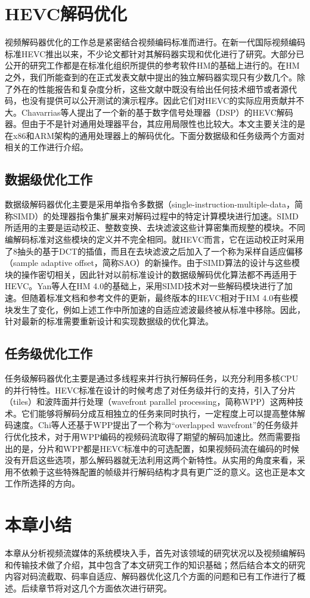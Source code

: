 \section{HEVC解码优化}

视频解码器优化的工作总是紧密结合视频编码标准而进行。在新一代国际视频编码标准HEVC推出以来，不少论文都针对其解码器实现和优化进行了研究。大部分已公开的研究工作都是在标准化组织所提供的参考软件HM\supercite{HM}的基础上进行的。在HM之外，我们所能查到的在正式发表文献中提出的独立解码器实现只有少数几个\supercite{Bossen-TCSVT2012,JCTVC-G988,JCTVC-H0693}。除了外在的性能报告和复杂度分析，这些文献中既没有给出任何技术细节或者源代码，也没有提供可以公开测试的演示程序。因此它们对HEVC的实际应用贡献并不大。Chavarrias等人\supercite{Chavarrias-TCE2013}提出了一个新的基于数字信号处理器（DSP）的HEVC解码器。但由于不是针对通用处理器平台，其应用局限性也比较大。本文主要关注的是在x86和ARM架构的通用处理器上的解码优化。下面分数据级和任务级两个方面对相关的工作进行介绍。

\subsection{数据级优化工作}

数据级解码器优化主要是采用单指令多数据（single-instruction-multiple-data，简称SIMD）的处理器指令集扩展来对解码过程中的特定计算模块进行加速。SIMD所适用的主要是运动校正、整数变换、去块滤波这些计算密集而规整的模块。不同编解码标准对这些模块的定义并不完全相同。就HEVC而言，它在运动校正时采用了8抽头的基于DCT的插值\supercite{JCTVC-F537}，而且在去块滤波之后加入了一个称为采样自适应偏移（sample adaptive offset，简称SAO）的新操作\supercite{Fu-TCSVT2012}。由于SIMD算法的设计与这些模块的操作密切相关，因此针对以前标准设计的数据级解码优化算法\supercite{Casalino-ICMCS1999,Lappalainen-TCSVT2003,Malvar-TCSVT2003,Chen-JVCIR2006,Pescador-TCE2009}都不再适用于HEVC。Yan等人\supercite{Yan-VCIP2012}在HM 4.0的基础上，采用SIMD技术对一些解码模块进行了加速。但随着标准文档和参考文件的更新，最终版本的HEVC相对于HM 4.0有些模块发生了变化，例如上述工作中所加速的自适应滤波\supercite{JCTVC-F303}最终被从标准中移除。因此，针对最新的标准需要重新设计和实现数据级的优化算法。

\subsection{任务级优化工作}

任务级解码器优化主要是通过多线程来并行执行解码任务，以充分利用多核CPU的并行特性。HEVC标准在设计的时候考虑了对任务级并行的支持，引入了分片（tiles）\supercite{JCTVC-E408}和波阵面并行处理（wavefront parallel processing，简称WPP）\supercite{JCTVC-E196}这两种技术。它们能够将解码分成互相独立的任务来同时执行，一定程度上可以提高整体解码速度。Chi等人\supercite{Chi-TCSVT2012}还基于WPP提出了一个称为“overlapped wavefront”的任务级并行优化技术，对于用WPP编码的视频码流取得了期望的解码加速比。然而需要指出的是，分片和WPP都是HEVC标准中的可选配置，如果视频码流在编码的时候没有开启这些选项，那么解码器就无法利用这两个新特性。从实用的角度来看，采用不依赖于这些特殊配置的帧级并行解码结构才具有更广泛的意义。这也正是本文工作所选择的方向。

\section{本章小结}

本章从分析视频流媒体的系统模块入手，首先对该领域的研究状况以及视频编解码和传输技术做了介绍，其中包含了本文研究工作的知识基础；然后结合本文的研究内容对码流截取、码率自适应、解码器优化这几个方面的问题和已有工作进行了概述。后续章节将对这几个方面依次进行研究。